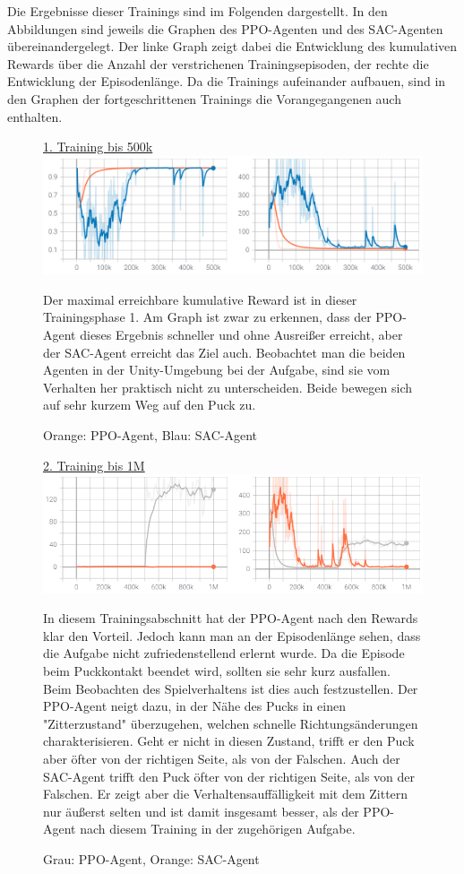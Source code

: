Die Ergebnisse dieser Trainings sind im Folgenden dargestellt. In den Abbildungen sind jeweils die Graphen des PPO-Agenten und des SAC-Agenten übereinandergelegt. Der linke Graph zeigt dabei die Entwicklung des kumulativen Rewards über die Anzahl der verstrichenen Trainingsepisoden, der rechte die Entwicklung der Episodenlänge. Da die Trainings aufeinander aufbauen, sind in den Graphen der fortgeschrittenen Trainings die  Vorangegangenen auch enthalten.\\
\newpage
\begin{figure} [h]
\underline{1. Training bis 500k} \\

\includegraphics[width=\textwidth]{images/reaching_erg}
\caption{Orange: PPO-Agent, Blau: SAC-Agent}
Der maximal erreichbare kumulative Reward ist in dieser Trainingsphase 1. Am Graph ist zwar zu erkennen, dass der PPO-Agent dieses Ergebnis schneller und ohne Ausreißer erreicht, aber der SAC-Agent erreicht das Ziel auch. Beobachtet man die beiden Agenten in der Unity-Umgebung bei der Aufgabe, sind sie vom Verhalten her praktisch nicht zu unterscheiden. Beide bewegen sich auf sehr kurzem Weg auf den Puck zu.
\end{figure}

\begin{figure} [h]
\underline{2. Training bis 1M} \\
\includegraphics[width=\textwidth]{images/rea2_erg}
\caption{Grau: PPO-Agent, Orange: SAC-Agent}

In diesem Trainingsabschnitt hat der PPO-Agent nach den Rewards klar den Vorteil. Jedoch kann man an der Episodenlänge sehen, dass die Aufgabe nicht zufriedenstellend erlernt wurde. Da die Episode beim Puckkontakt beendet wird, sollten sie sehr kurz ausfallen. Beim Beobachten des Spielverhaltens ist dies auch festzustellen. Der PPO-Agent neigt dazu, in der Nähe des Pucks in einen "Zitterzustand" überzugehen, welchen schnelle Richtungsänderungen charakterisieren. Geht er nicht in diesen Zustand, trifft er den Puck aber öfter von der richtigen Seite, als von der Falschen. Auch der SAC-Agent trifft den Puck öfter von der richtigen Seite, als von der Falschen. Er zeigt aber die Verhaltensauffälligkeit mit dem Zittern nur äußerst selten und ist damit insgesamt besser, als der PPO-Agent nach diesem Training in der zugehörigen Aufgabe.
\end{figure}

